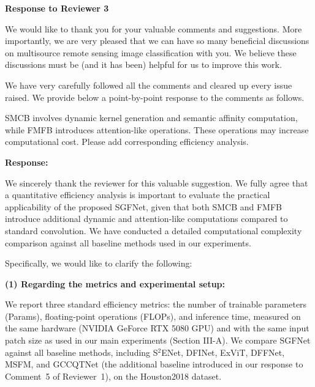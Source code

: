 \label{re:review_3}

\begin{center}
  \large\bf Response to Reviewer 3
\end{center}

We would like to thank you for your valuable comments and suggestions. More importantly, we are very pleased that we can have so many beneficial discussions on multisource remote sensing image classification with you. We believe these discussions must be (and it has been) helpful for us to improve this work.

We have very carefully followed all the comments and cleared up every issue raised. We provide below a point-by-point response to the comments as follows.

\begin{tcolorbox}[title={Reviewer \#3, Comment \#1}] 
  \vspace{1em}

  \color{blue}
  SMCB involves dynamic kernel generation and semantic affinity computation, while FMFB introduces attention-like operations. These operations may increase computational cost. Please add corresponding efficiency analysis.

  \vspace{1em}
\end{tcolorbox}

\textbf{Response:}

We sincerely thank the reviewer for this valuable suggestion. We fully agree that a quantitative efficiency analysis is important to evaluate the practical applicability of the proposed SGFNet, given that both SMCB and FMFB introduce additional dynamic and attention-like computations compared to standard convolution. We have conducted a detailed computational complexity comparison against all baseline methods used in our experiments. 

Specifically, we would like to clarify the following:

\textbf{(1) Regarding the metrics and experimental setup:}

We report three standard efficiency metrics: the number of trainable parameters (Params), floating-point operations (FLOPs), and inference time, measured on the same hardware (NVIDIA GeForce RTX 5080 GPU) and with the same input patch size as used in our main experiments (Section III-A). We compare SGFNet against all baseline methods, including S$^2$ENet, DFINet, ExViT, DFFNet, MSFM, and GCCQTNet (the additional baseline introduced in our response to Comment~5 of Reviewer~1), on the Houston2018 dataset.

